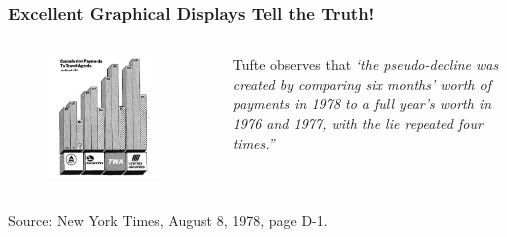 \documentclass[notes, aspectratio=1610]{beamer}
\begin{document}
\begin{frame}
	\frametitle{Excellent Graphical Displays Tell the Truth!}
	\begin{columns}
		\begin{column}{0.5\textwidth}
			\begin{figure}
				\begin{small}
					\begin{center}
					\includegraphics[width=0.9\textwidth]{
					images/commission_to_agents.png
					}
					\end{center}
				\end{small}
			\end{figure}
		\end{column}
		\begin{column}{0.5\textwidth}
			Tufte \cite[][page 54]{tufte2001} observes 
			that \emph{`the pseudo-decline was created by comparing six months' worth of 
			payments in 1978 to a full year's worth in 1976 and 1977, with the 
			lie repeated four times.''}
		\end{column}
	\end{columns}
\footnotesize
Source: New York Times, August 8, 1978, page D-1.
\end{frame}
\end{document}
